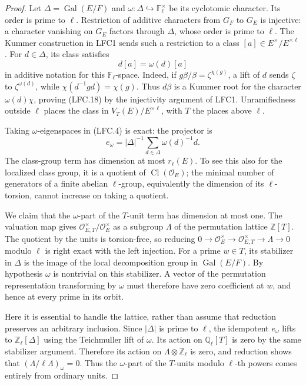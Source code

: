 \documentclass[11pt,a4paper]{article}
\numberwithin{equation}{section}
\theoremstyle{remark}\newtheorem{remark}[theorem]{Remark}
\begin{document}
\begin{proof}
Let \(\Delta=\operatorname{Gal}(E/F)\) and
\(\omega:\Delta\hookrightarrow\mathbb F_\ell^\times\)
be its cyclotomic character.  Its order is prime to \(\ell\).
Restriction of additive characters from \(G_F\) to \(G_E\)
is injective: a character vanishing on \(G_E\) factors
through \(\Delta\), whose order is prime to \(\ell\).
The Kummer construction in LFC1 sends such a restriction
to a class \([a]\in E^\times/E^{\times\ell}\).
For \(d\in\Delta\), its class satisfies
\[
                         d[a]=\omega(d)[a]               \tag{LFC.18}
\]
in additive notation for this \(\mathbb F_\ell\)-space.
Indeed, if \(g\beta/\beta=\zeta^{\chi(g)}\), a lift of \(d\)
sends \(\zeta\) to \(\zeta^{\omega(d)}\), while
\(\chi(d^{-1}gd)=\chi(g)\).  Thus \(d\beta\) is a
Kummer root for the character \(\omega(d)\chi\),
proving (LFC.18) by the injectivity argument of LFC1.
Unramifiedness outside \(\ell\) places the class in
\(V_T(E)/E^{\times\ell}\), with \(T\) the places above \(\ell\).

Taking \(\omega\)-eigenspaces in (LFC.4) is exact:
the projector is
\[
 e_\omega=|\Delta|^{-1}
           \sum_{d\in\Delta}\omega(d)^{-1}d.
 \]
The class-group term has dimension at most \(r_\ell(E)\).
To see this also for the localized class group, it is a
quotient of \(\operatorname{Cl}(\mathcal O_E)\);
the minimal number of generators of a finite abelian
\(\ell\)-group, equivalently the dimension of its
\(\ell\)-torsion, cannot increase on taking a quotient.

We claim that the \(\omega\)-part of the \(T\)-unit term
has dimension at most one.  The valuation map gives
\(\mathcal O_{E,T}^\times/\mathcal O_E^\times\) as a
subgroup \(\Lambda\) of the permutation lattice
\(\mathbb Z[T]\).  The quotient by the units is torsion-free,
so reducing
\(0\to\mathcal O_E^\times\to
 \mathcal O_{E,T}^\times\to\Lambda\to0\)
modulo \(\ell\) is right exact with the left injection.
For a prime \(w\in T\), its stabilizer in \(\Delta\) is
the image of the local decomposition group in
\(\operatorname{Gal}(E/F)\).  By hypothesis \(\omega\)
is nontrivial on this stabilizer.  A vector of the
permutation representation transforming by \(\omega\)
must therefore have zero coefficient at \(w\), and hence
at every prime in its orbit.

Here it is essential to handle the lattice, rather than
assume that reduction preserves an arbitrary inclusion.
Since \(|\Delta|\) is prime to \(\ell\), the idempotent
\(e_\omega\) lifts to \(\mathbb Z_\ell[\Delta]\) using
the Teichmuller lift of \(\omega\).
Its action on \(\mathbb Q_\ell[T]\) is zero by the same
stabilizer argument.  Therefore its action on
\(\Lambda\otimes\mathbb Z_\ell\) is zero, and reduction
shows that \((\Lambda/\ell\Lambda)_\omega=0\).
Thus the \(\omega\)-part of the \(T\)-units modulo
\(\ell\)-th powers comes entirely from ordinary units.


\end{proof}
\end{document}
